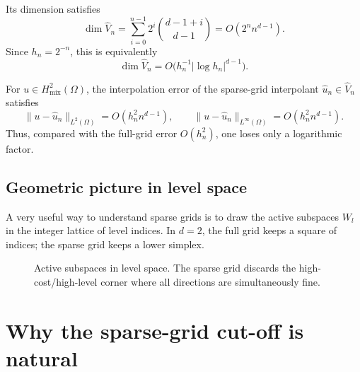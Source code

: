 \documentclass[11pt,a4paper]{report}
\begin{document}
Its dimension satisfies
$$
\dim \widehat V_n
=
\sum_{i=0}^{n-1} 2^i \binom{d-1+i}{d-1}
=
O(2^n n^{d-1}).
$$
Since $h_n=2^{-n}$, this is equivalently
$$
\dim \widehat V_n = O\!\bigl(h_n^{-1} |\log h_n|^{d-1}\bigr).
$$

For $u\in H^2_{\mathrm{mix}}(\Omega)$, the interpolation error of the sparse-grid interpolant $\widehat u_n\in\widehat V_n$ satisfies
$$
\|u-\widehat u_n\|_{L^2(\Omega)}
=
O(h_n^2 n^{d-1}),
\qquad
\|u-\widehat u_n\|_{L^\infty(\Omega)}
=
O(h_n^2 n^{d-1}).
$$
Thus, compared with the full-grid error $O(h_n^2)$, one loses only a logarithmic factor.

\subsection{Geometric picture in level space}

A very useful way to understand sparse grids is to draw the active subspaces $W_l$ in the integer lattice of level indices. In $d=2$, the full grid keeps a square of indices; the sparse grid keeps a lower simplex.

\begin{figure}[ht]
\centering
{}
\caption{Active subspaces in level space. The sparse grid discards the high-cost/high-level corner where all directions are simultaneously fine.}
\label{fig:level-set}
\end{figure}

\section{Why the sparse-grid cut-off is natural}
\end{document}

